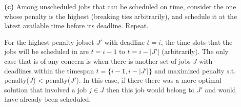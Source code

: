 \documentclass[11pt]{article}
\begin{document}
\begin{itemize}
\item[{\bf (c)}] Among unscheduled jobs that can be scheduled on time, consider the one
 whose penalty is the highest (breaking ties arbitrarily), and schedule it at the latest
 available time before its deadline. Repeat.

For the highest penalty jobset $J'$ with deadline $t=i$, the time slots that the jobs will 
be scheduled in are $t=i-1$ to $t=i-|J'|$ (arbitrarily). The only case that is of any concern 
is when there is another set of jobs $J$ with deadlines within the timespan $t=\{i-1,i-|J'|\}$ and
maximized penalty s.t. penalty($J$) < penalty($J'$).
In this case, if there there was a more optimal solution that involved a job $j\in J$ then this 
job would belong to $J'$ and would have already been scheduled.

% 
\end{itemize}
\label{pg:p3-continuation}

\newpage



% 
% 
% 
% 

% 
% 
% 
% 
% 
% 
% 
% 
% 
\end{document}
